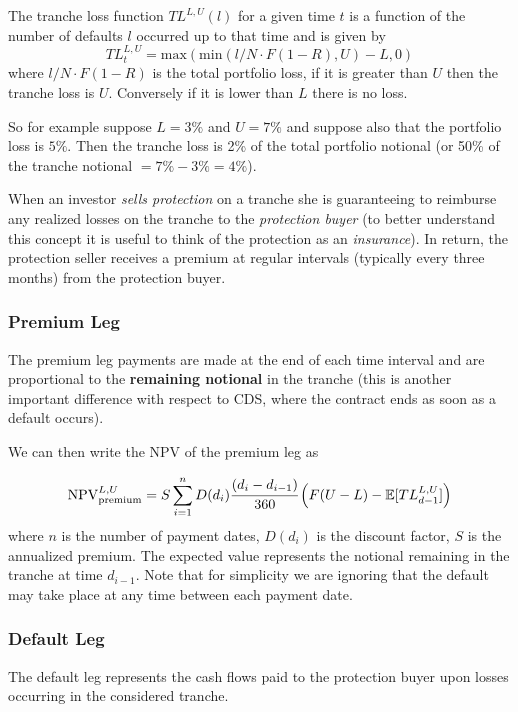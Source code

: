 The tranche loss function $TL^{L,U}(l)$ for a given time $t$ is a function of the number of defaults $l$ occurred up to that time and is given by
\begin{equation}
TL_{t}^{L,U}=\mathrm{max}(\mathrm{min}(l/N\cdot F(1-R), U)-L, 0)
\end{equation}
where $l/N\cdot F(1-R)$ is the total portfolio loss, if it is greater than $U$ then the tranche loss is $U$. Conversely if it is lower than $L$ there is no loss.

So for example suppose $L=3\%$ and $U=7\%$ and suppose also that the portfolio loss is $5\%$. Then the tranche loss is 2\% of the total portfolio notional (or 50\% of the tranche notional $=7\%-3\%=4\%$).

When an investor \emph{sells protection} on a tranche she is guaranteeing to reimburse any realized losses on the tranche to the \emph{protection buyer} (to better understand this concept it is useful to think of the protection as an \emph{insurance}). 
In return, the protection seller receives a premium at regular intervals (typically every three months) from the protection buyer.

\subsubsection{Premium Leg}
The premium leg payments are made at the end of each time interval and are proportional to the \textbf{remaining notional} in the tranche (this is another important difference with respect to CDS, where the contract ends as soon as a default occurs).

We can then write the NPV of the premium leg as

\begin{equation}
\mathrm{NPV}_{\mathrm{premium}}^{L,U}=S\sum^{n}_{i=1}D(d_i)\cfrac{(d_i - d_{i-1})}{360}\left(F(U-L)-\mathbb{E}[TL_{d-1}^{L,U}]\right)
\label{eq:cdo_npv_premium}
\end{equation}
where $n$ is the number of payment dates, $D(d_i)$ is the discount factor, $S$ is the annualized premium. The expected value represents the notional remaining in the tranche at time 
$d_{i-1}$.
Note that for simplicity we are ignoring that the default may take place at any time between each payment date.

\subsubsection{Default Leg}
The default leg represents the cash flows paid to the protection buyer upon losses occurring in the considered tranche. 

